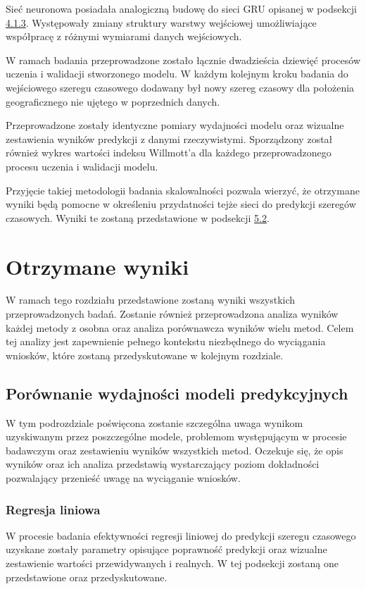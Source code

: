 \documentclass[10pt,a4paper]{article}
\begin{document}
Sieć neuronowa posiadała analogiczną budowę do sieci GRU opisanej w podsekcji \hyperlink{subsubsection.4.1.3}{4.1.3}. Występowały zmiany struktury warstwy wejściowej umożliwiające współpracę z różnymi wymiarami danych wejściowych.

W ramach badania przeprowadzone zostało łącznie dwadzieścia dziewięć procesów uczenia i walidacji stworzonego modelu. W każdym kolejnym kroku badania do wejściowego szeregu czasowego dodawany był nowy szereg czasowy dla położenia geograficznego nie ujętego w poprzednich danych. 

Przeprowadzone zostały identyczne pomiary wydajności modelu oraz wizualne zestawienia wyników predykcji z danymi rzeczywistymi. Sporządzony został również wykres wartości indeksu Willmott'a dla każdego przeprowadzonego procesu uczenia i walidacji modelu.

Przyjęcie takiej metodologii badania skalowalności pozwala wierzyć, że otrzymane wyniki będą pomocne w określeniu przydatności tejże sieci do predykcji szeregów czasowych. Wyniki te zostaną przedstawione w podsekcji \hyperlink{subsection.5.2}{5.2}.

\section{Otrzymane wyniki}
W ramach tego rozdziału przedstawione zostaną wyniki wszystkich przeprowadzonych badań. Zostanie również przeprowadzona analiza wyników każdej metody z osobna oraz analiza porównawcza wyników wielu metod. Celem tej analizy jest zapewnienie pełnego kontekstu niezbędnego do wyciągania wniosków, które zostaną przedyskutowane w kolejnym rozdziale. 

\subsection{Porównanie wydajności modeli predykcyjnych}
W tym podrozdziale poświęcona zostanie szczególna uwaga wynikom uzyskiwanym przez poszczególne modele, problemom występującym w procesie badawczym oraz zestawieniu wyników wszystkich metod. Oczekuje się, że opis wyników oraz ich analiza przedstawią wystarczający poziom dokładności pozwalający przenieść uwagę na wyciąganie wniosków.
 
\subsubsection{Regresja liniowa}
W procesie badania efektywności regresji liniowej do predykcji szeregu czasowego uzyskane zostały parametry opisujące poprawność predykcji oraz wizualne zestawienie wartości przewidywanych i realnych. W tej podsekcji zostaną one przedstawione oraz przedyskutowane. 
\end{document}

